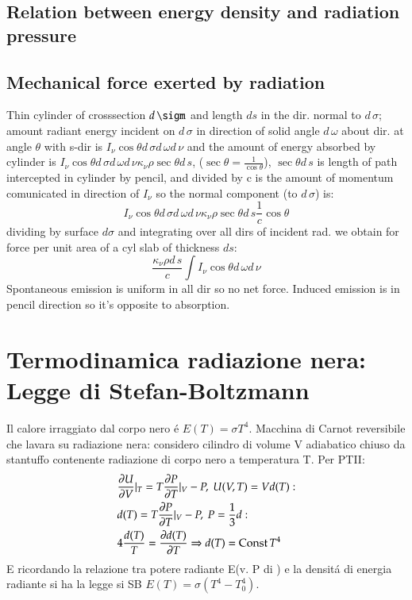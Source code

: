             \subsection{Relation between energy density and radiation pressure}
            \subsection{Mechanical force exerted by radiation}
                Thin cylinder of crosssection $d\,\sigm$ and length $ds$ in the dir. normal to $d\,\sigma$; amount radiant energy incident on $d\,\sigma$ in direction of solid angle $d\,\omega$ about dir. at angle $\theta$ with s-dir is $I_{\nu}\cos{\theta}d\,\sigma d\,\omega d\,\nu$ and the amount of energy absorbed by cylinder is $I_{\nu}\cos{\theta} d\,\sigma d\,\omega d\,\nu\kappa_{\nu}\rho\sec{\theta}d\,s$, ($\sec{\theta}=\frac{1}{\cos{\theta}}$), $\sec{\theta}d\,s$ is length of path intercepted in cylinder by pencil, and divided by c is the amount of momentum comunicated in direction of $I_{\nu}$ so the normal component (to $d\,\sigma$) is: 
                \begin{equation*}
                    I_{\nu}\cos{\theta}d\,\sigma d\,\omega d\,\nu\kappa_{\nu}\rho\sec{\theta}d\,s \frac{1}{c}\cos{\theta}
                \end{equation*}
                dividing by surface $d\sigma$ and integrating over all dirs of incident rad. we obtain for force per unit area of a cyl slab of thickness $ds$:
                \begin{equation*}
                    \frac{\kappa_{\nu}\rho d\,s}{c}\int I_{\nu}\cos{\theta}d\,\omega d\,\nu
                \end{equation*}
                Spontaneous emission is uniform in all dir so no net force. Induced emission is in pencil direction so it's opposite to absorption.
        \section{Termodinamica radiazione nera: Legge di Stefan-Boltzmann}
                Il calore irraggiato dal corpo nero \'e $E(T)=\sigma T^4$.
                Macchina di Carnot reversibile che lavara su radiazione nera: considero cilindro di volume V adiabatico chiuso da stantuffo contenente radiazione di corpo nero a temperatura T. Per PTII:
                \begin{align*}
                    &\PDy{V}{U}|_T=T\PDy{T}{P}|_V-P,\ U(V,T)=Vd(T):\\
                    &d(T)=T\PDy{T}{P}|_V-P,\ P=\frac{1}{3}d:\\
                    &4\frac{d(T)}{T}=\PDy{T}{d(T)}\Rightarrow d(T)=\const{}T^4
                \end{align*}
                E ricordando la relazione tra potere radiante E(v. P di \khhff) e la densit\'a di energia radiante si ha la legge si SB $E(T)=\sigma(T^4-T_0^4)$.
